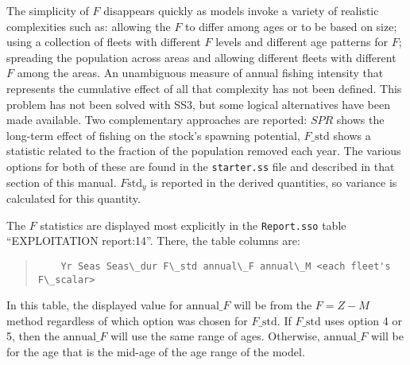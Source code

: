 The simplicity of $F$ disappears quickly as models invoke a variety of realistic complexities such as: allowing the $F$ to differ among ages or to be based on size; using a collection of fleets with different $F$ levels and different age patterns for $F$; spreading the population across areas and allowing different fleets with different $F$ among the areas. An unambiguous measure of annual fishing intensity that represents the cumulative effect of all that complexity has not been defined. This problem has not been solved with SS3, but some logical alternatives have been made available. Two complementary approaches are reported: $SPR$ shows the long-term effect of fishing on the stock’s spawning potential, $F\text{\_std}$ shows a statistic related to the fraction of the population removed each year. The various options for both of these are found in the \texttt{starter.ss} file and described in that section of this manual. $F\text{std}_y$ is reported in the derived quantities, so variance is calculated for this quantity.


The $F$ statistics are displayed most explicitly in the \texttt{Report.sso} table ``EXPLOITATION report:14''. There, the table columns are:
\begin{quote}
	\begin{verbatim}
	Yr Seas Seas\_dur F\_std annual\_F annual\_M <each fleet's F\_scalar>
	\end{verbatim}
\end{quote}

In this table, the displayed value for $\text{annual\_}F$ will be from the $F=Z-M$ method regardless of which option was chosen for $F\text{\_std}$. If $F\text{\_std}$ uses option 4 or 5, then the $\text{annual\_}F$ will use the same range of ages. Otherwise, $\text{annual\_}F$ will be for the age that is the mid-age of the age range of the model.


